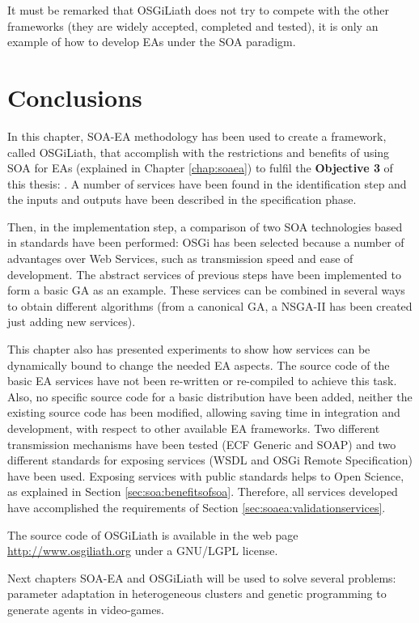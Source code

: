 It must be remarked that OSGiLiath does not try to compete with the
other frameworks (they are widely accepted, completed and tested), it
is only an example of how to develop EAs under the SOA paradigm. %


\section{Conclusions}

In this chapter, SOA-EA methodology has been used to create a framework, called OSGiLiath, that accomplish with the restrictions and benefits of using SOA for EAs (explained in Chapter \ref{chap:soaea}) to fulfil the \textbf{Objective 3} of this thesis: \objectiveframework . A number of services have been found in the identification step and the inputs and outputs have been described in the specification phase. 

Then, in the implementation step, a comparison of two SOA technologies based in standards have been performed: OSGi has been selected because a number of advantages over Web Services, such as transmission speed and ease of development. The abstract services of previous steps have been implemented to form a basic GA as an example. These services can be combined in several ways to obtain different algorithms (from a canonical GA, a NSGA-II has been created just adding new services). 

This chapter also has presented experiments to show how services can be dynamically bound to change the needed EA aspects. The source code of the basic EA services have not been re-written or re-compiled to achieve this task. Also, no specific source code for a basic distribution have been added, neither the existing source code has been modified, allowing saving time in integration and development, with respect to other available EA frameworks. Two different transmission mechanisms have been tested (ECF Generic and SOAP) and two different standards for exposing services (WSDL and OSGi Remote Specification) have been used. Exposing services with public standards helps to Open Science, as explained in Section \ref{sec:soa:benefitsofsoa}. Therefore, all services developed have accomplished the requirements of Section \ref{sec:soaea:validationservices}.

The source code of OSGiLiath is available in the web page \url{http://www.osgiliath.org} under a GNU/LGPL license.

Next chapters SOA-EA and OSGiLiath will be used to solve several problems: parameter adaptation in heterogeneous clusters and genetic programming to generate agents in video-games.
